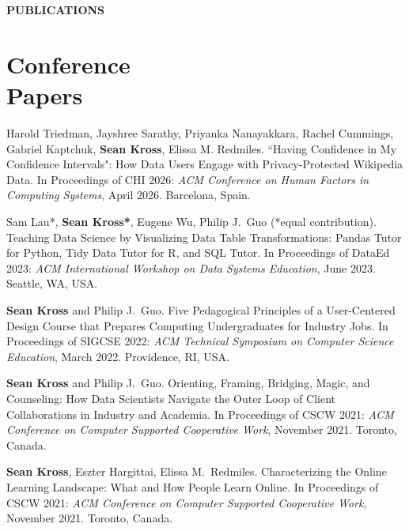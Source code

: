 \section{} \vspace{0.2in} \textbf{PUBLICATIONS} \vspace{-0.05in}


\section{Conference \\ Papers}

\begin{bibenum}

\item[C.16] Harold Triedman, Jayshree Sarathy, Priyanka Nanayakkara, Rachel Cummings, Gabriel Kaptchuk, \textbf{Sean Kross}, Elissa M. Redmiles. ``Having Confidence in My Confidence Intervals": How Data Users Engage with Privacy-Protected Wikipedia Data. 
In Proceedings of CHI 2026: \emph{ACM Conference on Human Factors in Computing 
Systems}, April 2026. Barcelona, Spain.

\item[C.15] Sam Lau*, \textbf{Sean Kross*}, Eugene Wu, Philip J.\ Guo  (*equal contribution). 
Teaching Data Science by Visualizing Data Table Transformations: Pandas Tutor for Python, Tidy Data Tutor for R, and SQL Tutor.
In Proceedings of DataEd 2023: \emph{ACM International Workshop on Data Systems Education}, June 2023. Seattle, WA, USA.

\item[C.14] \textbf{Sean Kross} and Philip J.\ Guo. 
Five Pedagogical Principles of a User-Centered Design Course that Prepares Computing Undergraduates for Industry Jobs.
In Proceedings of SIGCSE 2022: \emph{ACM Technical Symposium on Computer Science Education}, March 2022. Providence, RI, USA.

\item[C.13] \textbf{Sean Kross} and Philip J.\ Guo. 
Orienting, Framing, Bridging, Magic, and Counseling: How Data Scientists Navigate the Outer Loop of Client Collaborations in Industry and Academia.
In Proceedings of CSCW 2021: \emph{ACM Conference on Computer Supported Cooperative Work}, November 2021. Toronto, Canada.

\item[C.12] \textbf{Sean Kross}, Eszter Hargittai, Elissa M.\ Redmiles. 
Characterizing the Online Learning Landscape: What and How People Learn Online.
In Proceedings of CSCW 2021: \emph{ACM Conference on Computer Supported Cooperative Work}, November 2021. Toronto, Canada.


\end{bibenum}
